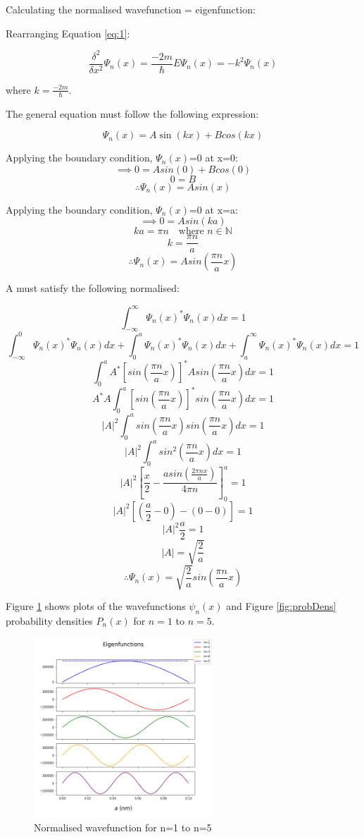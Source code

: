 Calculating the normalised wavefunction = eigenfunction:

Rearranging Equation \ref{eq:1}:

$$\frac{\delta^{2}}{\delta x^{2}}\Psi_n (x) = \frac{-2m}{\hbar} E \Psi_n (x) = -k^2 \Psi_n (x)$$

where $k=\frac{-2m}{\hbar}$.

The general equation must follow the following expression:

$$\Psi_n (x) = A \sin(kx) + B cos(kx)$$ %

Applying the boundary condition, $\Psi_n (x)$=0 at x=0:
$$\implies 0 = A sin(0) + B cos(0)$$
$$ 0 = B$$
$$\therefore \Psi_n (x) = A sin(x)$$

Applying the boundary condition, $\Psi_n (x)$=0 at x=a:
$$\implies 0 = A sin(ka)$$ %
$$ ka = \pi n \quad \text{where } n \in \mathbb{N}$$
$$ k = \frac{\pi n}{a}$$
$$\therefore \Psi_n (x) = A sin(\frac{\pi n}{a}x)$$

A must satisfy the following normalised:

$$\int_{ -\infty}^{\infty}\Psi_n (x)^{*}\Psi_n (x)dx = 1$$
$$\int_{ -\infty}^{0}\Psi_n (x)^{*}\Psi_n (x)dx +\int_{0}^{a}\Psi_n (x)^{*}\Psi_n (x)dx + \int_{ a}^{\infty}\Psi_n (x)^{*}\Psi_n (x)dx= 1$$
$$\int_{ 0}^{a} A^{*} [sin(\frac{\pi n}{a}x)]^{*}A sin(\frac{\pi n}{a}x)dx = 1$$
$$A^{*}A\int_{ 0}^{a} [sin(\frac{\pi n}{a}x)]^{*}sin(\frac{\pi n}{a}x)dx = 1$$
$$\left | A \right |^2 \int_{ 0}^{a} sin(\frac{\pi n}{a}x) sin(\frac{\pi n}{a}x)dx = 1$$
$$\left | A \right |^2 \int_{ 0}^{a} sin^{2}(\frac{\pi n}{a}x)dx = 1$$
$$\left | A \right |^2 \left[\frac{x}{2}-\frac{asin(\frac{2 \pi nx}{a})}{4 \pi n}\right]_0^a= 1$$
$$\left | A \right |^2 [(\frac{a}{2}-0)-(0-0)]= 1$$
$$\left | A \right |^2 \frac{a}{2}= 1$$
$$\left | A \right | = \sqrt{\frac{2}{a}}$$
$$\therefore \Psi_n (x) = \sqrt{\frac{2}{a}} sin(\frac{\pi n}{a}x)$$ %

Figure \ref{fig:normWave} shows plots of the wavefunctions $\psi_n(x)$ and Figure \ref{fig:probDens} probability densities $P_n(x)$ for $n=1$ to $n=5$. 
 
\begin{figure}[h]
    \centering
    \includegraphics[width=0.6\textwidth]{lab1/normalisedWavefunction.png}
    \caption{Normalised wavefunction for n=1 to n=5}
    \label{fig:normWave}
\end{figure}

